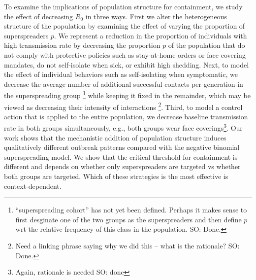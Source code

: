 \documentclass{imammb}
\numberwithin{equation}{section}
\begin{document}
To examine the implications of population structure for containment, we study the effect of decreasing $R_0$ in three ways. First we alter the heterogeneous structure of the population by examining the effect of varying the proportion of superspreaders $p$. We represent a reduction in the proportion of individuals with high transmission rate by decreasing the proportion $p$ of the population that do not comply with protective policies such as stay-at-home orders or face covering mandates, do not self-isolate when sick, or exhibit high shedding. Next, to model the effect of individual behaviors such as self-isolating when symptomatic, we decrease the average number of additional successful contacts per generation in the superspreading group \footnote{``superspreading cohort'' has not yet been defined. Perhaps it makes sense to first desginate one of the two groups as the superspreaders and then define $p$ wrt the relative frequency of this class in the population. SO: Done.} while keeping it fixed in the remainder, which may be viewed as decreasing their intensity of interactions \footnote{Need a linking phrase saying why we did this -- what is the rationale? SO: Done.}. Third, to model a control action that is applied to the entire population, we decrease baseline transmission rate in both groups simultaneously, e.g., both groups wear face coverings\footnote{Again, rationale is needed SO: done}. Our work shows that the mechanistic addition of population structure induces qualitatively different outbreak patterns compared with the negative binomial superspreading model. We show that the critical threshold for containment is different and depends on whether only superspreaders are targeted vs whether both groups are targeted. Which of these strategies is the most effective is context-dependent. 


 


 
\end{document}
